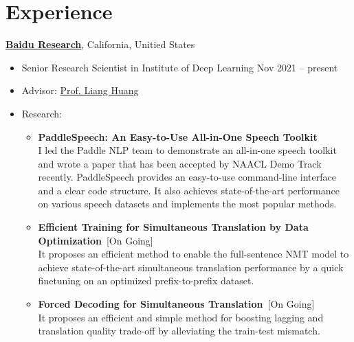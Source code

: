 
\section{\sc Experience}

{\bf \href{http://research.baidu.com/}{Baidu Research}}, California, Unitied States
\begin{itemize}
    \item[] Senior Research Scientist in Institute of Deep Learning \hfill Nov 2021 -- present
    \item[] Advisor: \href{https://web.engr.oregonstate.edu/~huanlian/}{Prof. Liang Huang}
    \item[] Research:
    \begin{itemize}
        \item {\bf PaddleSpeech: An Easy-to-Use All-in-One Speech Toolkit}~\cite{tmp-paddlespeech} \\
            I led the Paddle NLP team to demonstrate an all-in-one speech toolkit and wrote a paper that has been accepted by NAACL Demo Track recently. PaddleSpeech provides an easy-to-use command-line interface and a clear code structure. It also achieves state-of-the-art performance on various speech datasets and implements the most popular methods.
        \item {\bf Efficient Training for Simultaneous Translation by Data Optimization}~[On Going] \\
            It proposes an efficient method to enable the full-sentence NMT model to achieve state-of-the-art simultaneous translation performance by a quick finetuning on an optimized prefix-to-prefix dataset.
        \item {\bf Forced Decoding for Simultaneous Translation}~[On Going] \\
            It proposes an efficient and simple method for boosting lagging and translation quality trade-off by alleviating the train-test mismatch.
    \end{itemize}
\end{itemize}

